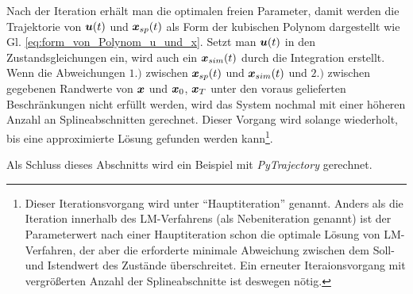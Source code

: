 Nach der Iteration erhält man die optimalen freien Parameter, damit werden die Trajektorie von $\boldsymbol u(t)$ und $\boldsymbol x_{sp}(t)$ als Form der kubischen Polynom dargestellt wie Gl. \eqref{eq:form_von_Polynom_u_und_x}. Setzt man $\boldsymbol u(t)$ in den Zustandsgleichungen ein, wird auch ein $\boldsymbol x_{sim}(t)$ durch die Integration erstellt. Wenn die Abweichungen $1.)$ zwischen $\boldsymbol x_{sp}(t)$ und $\boldsymbol x_{sim}(t)$ und $2.)$ zwischen gegebenen Randwerte von $\boldsymbol x$ und $\boldsymbol x_{0}$, $\boldsymbol x_{T}$ unter den voraus gelieferten Beschränkungen nicht erfüllt werden, wird das System nochmal mit einer höheren Anzahl an Splineabschnitten gerechnet. Dieser Vorgang wird solange wiederholt, bis eine approximierte Lösung gefunden werden kann\footnote{Dieser Iterationsvorgang wird unter ``Hauptiteration'' genannt. Anders als die Iteration innerhalb des LM-Verfahrens (als Nebeniteration genannt)\label{Nebeniteraion} ist der Parameterwert nach einer Hauptiteration schon die optimale Lösung von LM-Verfahren, der aber die erforderte minimale Abweichung zwischen dem Soll- und Istendwert des Zustände überschreitet. Ein erneuter Iteraionsvorgang mit vergrößerten Anzahl der Splineabschnitte ist deswegen nötig.}.

Als Schluss dieses Abschnitts wird ein Beispiel mit \emph{PyTrajectory} gerechnet.

